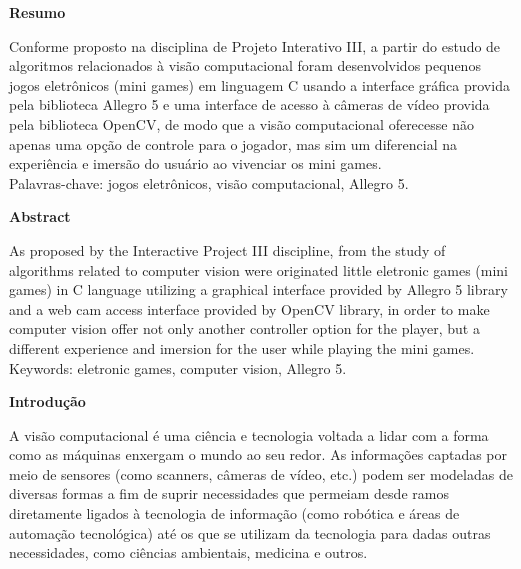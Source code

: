 \documentclass[a4paper]{article}
\begin{document}
\break

\begin{center}
\textbf{\Large Resumo}
\end{center}

Conforme proposto na disciplina de Projeto Interativo III, a partir do estudo de algoritmos relacionados à visão computacional foram desenvolvidos pequenos jogos eletrônicos (mini games) em linguagem C usando a interface gráfica provida pela biblioteca Allegro 5 e uma interface de acesso à câmeras de vídeo provida pela biblioteca OpenCV, de modo que a visão computacional oferecesse não apenas uma opção de controle para o jogador, mas sim um diferencial na experiência e imersão do usuário ao vivenciar os mini games.\\

Palavras-chave: jogos eletrônicos, visão computacional, Allegro 5.\\	

\break

\begin{center}
\textbf{\Large Abstract}
\end{center}

As proposed by the Interactive Project III discipline, from the study of algorithms related to computer vision were originated little eletronic games (mini games) in C language utilizing a graphical interface provided by Allegro 5 library and a web cam access interface provided by OpenCV library, in order to make computer vision offer not only another controller option for the player, but a different experience and imersion for the user while playing the mini games.\\

Keywords: eletronic games, computer vision, Allegro 5.\\

\break


\begin{center}
\textbf{\Large Introdução}
\end{center}

A visão computacional é uma ciência e tecnologia voltada a lidar com a forma como as máquinas enxergam o mundo ao seu redor. As informações captadas por meio de sensores (como scanners, câmeras de vídeo, etc.) podem ser modeladas de diversas formas a fim de suprir necessidades que permeiam desde ramos diretamente ligados à tecnologia de informação (como robótica e áreas de automação tecnológica) até os que se utilizam da tecnologia para dadas outras necessidades, como ciências ambientais, medicina e outros.\\
\end{document}
